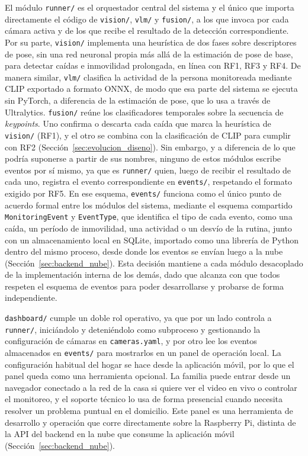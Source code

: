 El módulo \texttt{runner/} es el orquestador central del sistema y el único que importa directamente el código de \texttt{vision/}, \texttt{vlm/} y \texttt{fusion/}, a los que invoca por cada cámara activa y de los que recibe el resultado de la detección correspondiente.
Por su parte, \texttt{vision/} implementa una heurística de dos fases sobre descriptores de pose, sin una red neuronal propia más allá de la estimación de pose de base, para detectar caídas e inmovilidad prolongada, en línea con RF1, RF3 y RF4.
De manera similar, \texttt{vlm/} clasifica la actividad de la persona monitoreada mediante CLIP exportado a formato ONNX, de modo que esa parte del sistema se ejecuta sin PyTorch, a diferencia de la estimación de pose, que lo usa a través de Ultralytics.
\texttt{fusion/} reúne los clasificadores temporales sobre la secuencia de \textit{keypoints}.
Uno confirma o descarta cada caída que marca la heurística de \texttt{vision/} (RF1), y el otro se combina con la clasificación de CLIP para cumplir con RF2 (Sección~\ref{sec:evolucion_diseno}).
Sin embargo, y a diferencia de lo que podría suponerse a partir de sus nombres, ninguno de estos módulos escribe eventos por sí mismo, ya que es \texttt{runner/} quien, luego de recibir el resultado de cada uno, registra el evento correspondiente en \texttt{events/}, respetando el formato exigido por RF5.
En ese esquema, \texttt{events/} funciona como el único punto de acuerdo formal entre los módulos del sistema, mediante el esquema compartido \texttt{MonitoringEvent} y \texttt{EventType}, que identifica el tipo de cada evento, como una caída, un período de inmovilidad, una actividad o un desvío de la rutina, junto con un almacenamiento local en SQLite, importado como una librería de Python dentro del mismo proceso, desde donde los eventos se envían luego a la nube (Sección~\ref{sec:backend_nube}).
Esta decisión mantiene a cada módulo desacoplado de la implementación interna de los demás, dado que alcanza con que todos respeten el esquema de eventos para poder desarrollarse y probarse de forma independiente.

\texttt{dashboard/} cumple un doble rol operativo, ya que por un lado controla a \texttt{runner/}, iniciándolo y deteniéndolo como subproceso y gestionando la configuración de cámaras en \texttt{cameras.yaml}, y por otro lee los eventos almacenados en \texttt{events/} para mostrarlos en un panel de operación local. La configuración habitual del hogar se hace desde la aplicación móvil, por lo que el panel queda como una herramienta opcional. La familia puede entrar desde un navegador conectado a la red de la casa si quiere ver el video en vivo o controlar el monitoreo, y el soporte técnico lo usa de forma presencial cuando necesita resolver un problema puntual en el domicilio.
Este panel es una herramienta de desarrollo y operación que corre directamente sobre la Raspberry Pi, distinta de la API del backend en la nube que consume la aplicación móvil (Sección~\ref{sec:backend_nube}).

